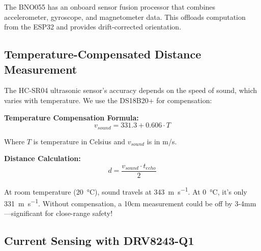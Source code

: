 \documentclass[11pt,letterpaper]{article}
\begin{document}
\begin{keypoint}
The BNO055 has an onboard sensor fusion processor that combines accelerometer, gyroscope, and magnetometer data. This offloads computation from the ESP32 and provides drift-corrected orientation.
\end{keypoint}

\subsection{Temperature-Compensated Distance Measurement}

The HC-SR04 ultrasonic sensor's accuracy depends on the speed of sound, which varies with temperature. We use the DS18B20+ for compensation:

\begin{center}
\end{center}

\textbf{Temperature Compensation Formula:}
\begin{equation}
v_{sound} = 331.3 + 0.606 \cdot T
\end{equation}

Where $T$ is temperature in Celsius and $v_{sound}$ is in m/s.

\textbf{Distance Calculation:}
\begin{equation}
d = \frac{v_{sound} \cdot t_{echo}}{2}
\end{equation}

\begin{plainenglish}
At room temperature (\SI{20}{\celsius}), sound travels at \SI{343}{\meter\per\second}. At \SI{0}{\celsius}, it's only \SI{331}{\meter\per\second}. Without compensation, a 10cm measurement could be off by 3-4mm---significant for close-range safety!
\end{plainenglish}

\subsection{Current Sensing with DRV8243-Q1}
\end{document}

